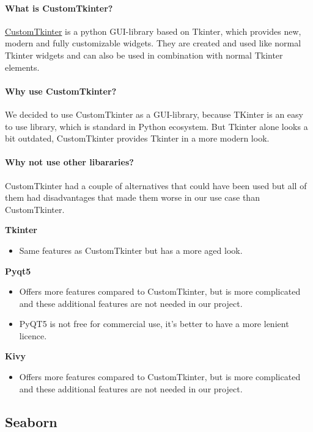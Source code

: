 \documentclass[letterpaper,10pt,english]{sphinxmanual}
\begin{document}
\paragraph{What is CustomTkinter?}
\href{https://github.com/TomSchimansky/CustomTkinter}{CustomTkinter} is a python GUI-library based on Tkinter, which provides new, modern and fully customizable widgets. They are created and used like normal Tkinter widgets and can also be used in combination with normal Tkinter elements. 

\paragraph{Why use CustomTkinter?}
We decided to use CustomTkinter as a GUI-library, because TKinter is an easy to use library, which is standard in Python ecosystem.
But Tkinter alone looks a bit outdated, CustomTkinter provides Tkinter in a more modern look.

\paragraph{Why not use other libararies?}
CustomTkinter had a couple of alternatives that could have been used but all of them had disadvantages that made them worse in our use case than CustomTkinter. 
  
\textbf{Tkinter}
\begin{itemize}
    \item Same features as CustomTkinter but has a more aged look.
\end{itemize}
  
\textbf{Pyqt5}
\begin{itemize}
    \item Offers more features compared to CustomTkinter, but is more complicated and these additional features are not needed in our project.
    \item PyQT5 is not free for commercial use, it's better to have a more lenient licence.
\end{itemize}
\textbf{Kivy}
\begin{itemize}
    \item Offers more features compared to CustomTkinter, but is more complicated and these additional features are not needed in our project. 
\end{itemize}


\subsection{Seaborn}
\end{document}
